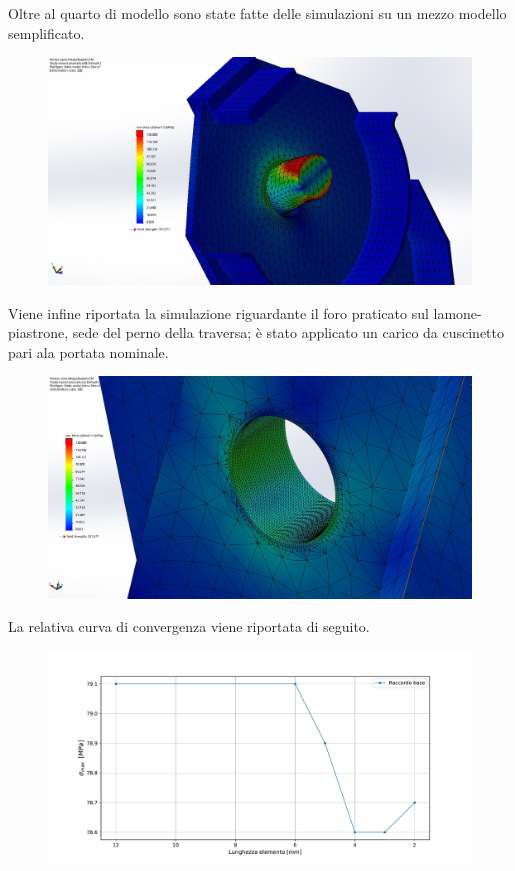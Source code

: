 Oltre al quarto di modello sono state fatte delle simulazioni su un mezzo modello semplificato. 
\begin{figure}[H]
\centering
  \includegraphics[width=.6\textwidth]{imgs/fem/MezzoBozzello-Asse}
\caption{}
\label{fig:MezzoBozzello-Asse}
\end{figure}
Viene infine riportata la simulazione riguardante il foro praticato sul lamone-piastrone, sede del perno della traversa; è stato applicato un carico da cuscinetto pari ala portata nominale.
\begin{figure}[H]
\centering
  \includegraphics[width=.6\textwidth]{imgs/fem/MezzoBozzello-Traversa.jpg}
\caption{}
\label{fig:MezzoBozzello-Traversa}
\end{figure}
La relativa curva di convergenza viene riportata di seguito. 
\begin{figure}[H]
\centering
  \includegraphics[width=.55\textwidth]{imgs/fem/MezzoBozzello-Traversa.pdf}
\caption{}
\label{fig:MezzoBozzello-TraversaConv}
\end{figure}

